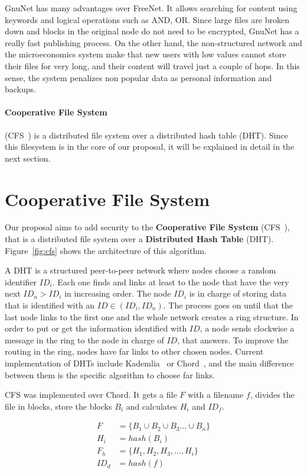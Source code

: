 \documentclass{llncs}
\begin{document}
GnuNet has many advantages over FreeNet. It allows searching for content using keywords
and logical operations such as AND, OR. Since large files are broken down and blocks in the original node do not need to be encrypted, GnuNet has a really fast publishing process. On the other hand, the non-structured network and the microeconomics system make that new users with low values cannot store their files for very long, and their content will travel just a couple of hops. In this sense, the system penalizes non popular data as personal information and backups.

\paragraph{Cooperative File System} (CFS~\cite{CFS}) is a distributed file system over a distributed hash table (DHT). Since this filesystem is in the core of our proposal, it will be explained in detail in the next section.

\section{Cooperative File System}
\label{sec:cfs}

Our proposal aims to add security to the \textbf{Cooperative File System} (CFS~\cite{CFS}), that is a distributed file system over a \textbf{Distributed Hash Table} (DHT). Figure~\ref{fig:cfs} shows the architecture of this algorithm.

A DHT is a structured peer-to-peer network where nodes choose a random identifier $ID_i$. Each one finds and links at least to the node that have the very next $ID_n>ID_i$ in increasing order. The node $ID_i$ is in charge of storing data that is identified with an $ID\in(ID_i, ID_n)$. The process goes on until that the last node links to the first one and the whole network creates a ring structure. In order to put or get the information identified with $ID$, a node sends clockwise a message in the ring to the node in charge of $ID$, that answers. To improve the routing in the ring, nodes have far links to other chosen nodes. Current implementation of DHTs include Kademlia~\cite{KADEMLIA} or Chord~\cite{CHORD}, and the main difference between them is the specific algorithm to choose far links.

CFS was implemented over Chord. It gets a file $F$ with a filename $f$, divides the file in blocks, store the blocks $B_i$ and calculates $H_i$ and $ID_f$.

\begin{align}
 F & = \lbrace B_1 \cup B_2 \cup B_3 ... \cup B_n \rbrace \\
 H_i & = hash(B_i) \\
 F_h & = \lbrace H_1, H_2, H_3 ,..., H_i \rbrace \\
 ID_d & = hash(f)
 \end{align}
\end{document}

